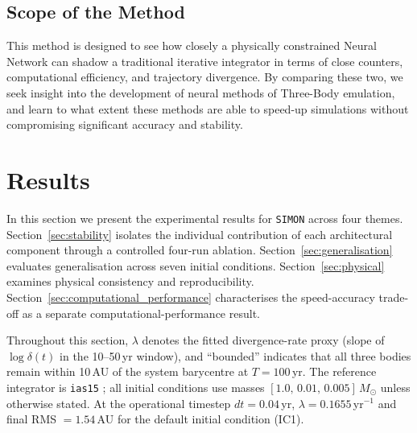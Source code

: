 \documentclass[12pt]{article}
\begin{document}

\subsection{Scope of the Method}
This method is designed to see how closely a physically constrained Neural Network can shadow a traditional iterative integrator in terms of close counters, computational efficiency, and trajectory divergence. By comparing these two, we seek insight into the development of neural methods of Three-Body emulation, and learn to what extent these methods are able to speed-up simulations without compromising significant accuracy and stability.

\section{Results}
\label{sec:results}

In this section we present the experimental results for \texttt{SIMON} across four
themes. Section~\ref{sec:stability} isolates the individual contribution of each
architectural component through a controlled four-run ablation. Section~\ref{sec:generalisation}
evaluates generalisation across seven initial conditions. Section~\ref{sec:physical}
examines physical consistency and reproducibility. Section~\ref{sec:computational_performance}
characterises the speed-accuracy trade-off as a separate computational-performance result.

Throughout this section, $\lambda$ denotes the fitted divergence-rate proxy (slope of
$\log\delta(t)$ in the 10--50\,yr window), and ``bounded'' indicates that all three
bodies remain within 10\,AU of the system barycentre at $T = 100$\,yr. The reference
integrator is \texttt{ias15} \citep{Rein_2014}; all initial conditions use masses
$[1.0,\,0.01,\,0.005]\,M_\odot$ unless otherwise stated. At the operational timestep
$dt = 0.04$\,yr, $\lambda = 0.1655$\,yr$^{-1}$ and final RMS $= 1.54$\,AU for the
default initial condition (IC1).
\end{document}
